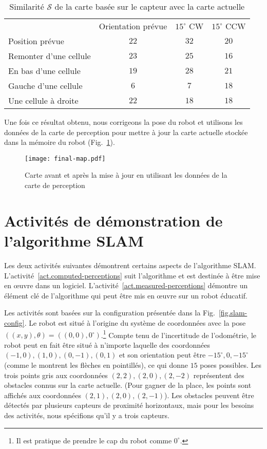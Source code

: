 \begin{table}
\caption{Similarité $\mathcal{S}$ de la carte basée sur le capteur avec la carte actuelle}
\label{tab.matching}
\renewcommand{\arraystretch}{1.2}
\setlength{\tabcolsep}{8pt}
\begin{tabular}{p{33mm}ccc}
\hline
&Orientation prévue&$15^{\circ}$ CW&$15^{\circ}$ CCW\\
Position prévue & $22$ & \boldmath $32$ & $20$\\
Remonter d'une cellule & $23$ & $25$ & $16$\\
En bas d'une cellule     & $19$ & $28$ & $21$\\
Gauche d'une cellule     & $6$  & $7$  & $18$\\
Une cellule à droite    & $22$ & $18$ & $18$\\
\hline
\end{tabular}
\end{table}

Une fois ce résultat obtenu, nous corrigeons la pose du robot et utilisons les données de la carte de perception pour mettre à jour la carte actuelle stockée dans la mémoire du robot (Fig.~\ref{fig.final-map}).

\begin{figure}
\begin{center}
\texttt{[image: final-map.pdf]}
\end{center}
\caption{Carte avant et après la mise à jour en utilisant les données de la carte de perception}
\label{fig.final-map}
\end{figure}

\section{Activités de démonstration de l'algorithme SLAM}\label{s.slam-activities}

Les deux activités suivantes démontrent certains aspects de l'algorithme SLAM. L'activité~\ref{act.computed-perceptions} suit l'algorithme et est destinée à être mise en œuvre dans un logiciel. L'activité~\ref{act.measured-perceptions} démontre un élément clé de l'algorithme qui peut être mis en œuvre sur un robot éducatif.

Les activités sont basées sur la configuration présentée dans la Fig.~\ref{fig.slam-config}. Le robot est situé à l'origine du système de coordonnées avec la pose $((x,y),\theta)=((0,0),0^\circ)$.\footnote{Il est pratique de prendre le cap du robot comme $0^\circ$.} Compte tenu de l'incertitude de l'odométrie, le robot peut en fait être situé à n'importe laquelle des coordonnées $(-1,0), (1,0), (0,-1), (0,1)$ et son orientation peut être $-15^\circ, 0, -15^\circ$ (comme le montrent les flèches en pointillés), ce qui donne $15$ poses possibles. Les trois points gris aux coordonnées $(2,2), (2,0), (2,-2)$ représentent des obstacles connus sur la carte actuelle. (Pour gagner de la place, les points sont affichés aux coordonnées $(2,1), (2,0), (2,-1)$). Les obstacles peuvent être détectés par plusieurs capteurs de proximité horizontaux, mais pour les besoins des activités, nous spécifions qu'il y a trois capteurs.

